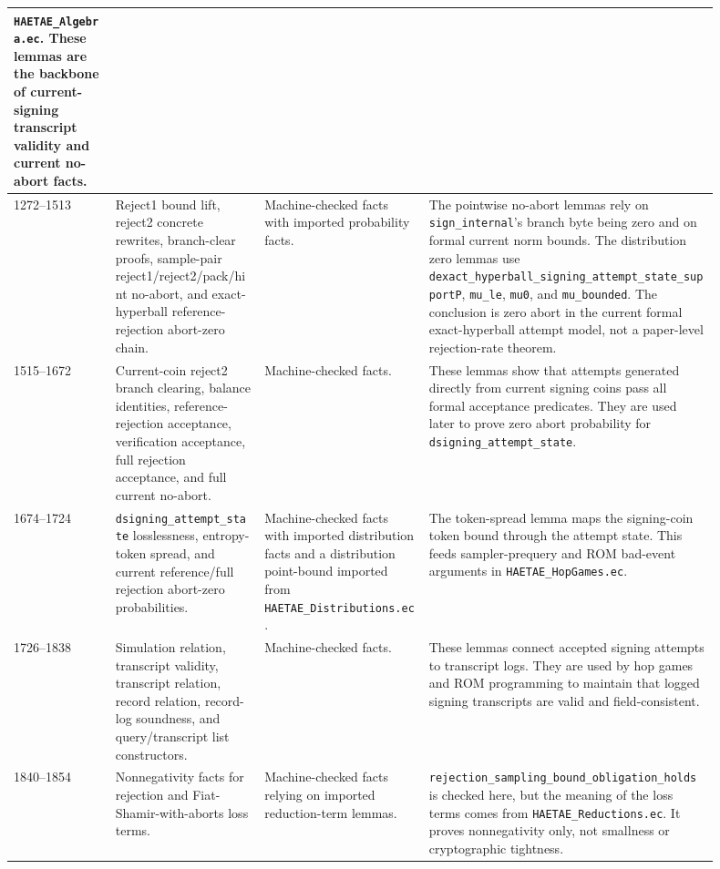 \documentclass[11pt]{report}
\DeclareRobustCommand{\file}[1]{\ifmmode\text{\nolinkurl{#1}}\else\nolinkurl{#1}\fi}
\DeclareRobustCommand{\ec}[1]{\ifmmode\text{\nolinkurl{#1}}\else\nolinkurl{#1}\fi}
\theoremstyle{definition}
\theoremstyle{plain}
\begin{document}
\begin{longtable}{p{0.13\linewidth}p{0.19\linewidth}p{0.21\linewidth}p{0.37\linewidth}}
\file{HAETAE\_Algebra.ec}.  These lemmas are the backbone of current-signing
transcript validity and current no-abort facts. \\
\midrule
1272--1513 &
Reject1 bound lift, reject2 concrete rewrites, branch-clear proofs,
sample-pair reject1/reject2/pack/hint no-abort, and exact-hyperball
reference-rejection abort-zero chain. &
Machine-checked facts with imported probability facts. &
The pointwise no-abort lemmas rely on \ec{sign\_internal}'s branch byte being
zero and on formal current norm bounds.  The distribution zero lemmas use
\ec{dexact\_hyperball\_signing\_attempt\_state\_supportP}, \ec{mu\_le},
\ec{mu0}, and \ec{mu\_bounded}.  The conclusion is zero abort in the current
formal exact-hyperball attempt model, not a paper-level rejection-rate theorem. \\
\midrule
1515--1672 &
Current-coin reject2 branch clearing, balance identities, reference-rejection
acceptance, verification acceptance, full rejection acceptance, and full
current no-abort. &
Machine-checked facts. &
These lemmas show that attempts generated directly from current signing coins
pass all formal acceptance predicates.  They are used later to prove zero
abort probability for \ec{dsigning\_attempt\_state}. \\
\midrule
1674--1724 &
\ec{dsigning\_attempt\_state} losslessness, entropy-token spread, and current
reference/full rejection abort-zero probabilities. &
Machine-checked facts with imported distribution facts and a distribution
point-bound imported from \file{HAETAE\_Distributions.ec}. &
The token-spread lemma maps the signing-coin token bound through the attempt
state.  This feeds sampler-prequery and ROM bad-event arguments in
\file{HAETAE\_HopGames.ec}. \\
\midrule
1726--1838 &
Simulation relation, transcript validity, transcript relation, record
relation, record-log soundness, and query/transcript list constructors. &
Machine-checked facts. &
These lemmas connect accepted signing attempts to transcript logs.  They are
used by hop games and ROM programming to maintain that logged signing
transcripts are valid and field-consistent. \\
\midrule
1840--1854 &
Nonnegativity facts for rejection and Fiat-Shamir-with-aborts loss terms. &
Machine-checked facts relying on imported reduction-term lemmas. &
\ec{rejection\_sampling\_bound\_obligation\_holds} is checked here, but the
meaning of the loss terms comes from \file{HAETAE\_Reductions.ec}.  It proves
nonnegativity only, not smallness or cryptographic tightness. \\

\end{longtable}
\end{document}
